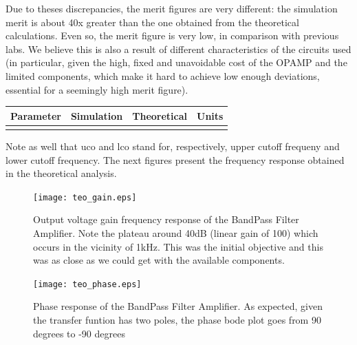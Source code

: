 Due to theses discrepancies, the merit figures are very different: the simulation merit is about 40x greater than the one obtained from the theoretical calculations. Even so, the merit figure is very low, in comparison with previous labs. We believe this is also a result of different characteristics of the circuits used (in particular, given the high, fixed and unavoidable cost of the OPAMP and the limited components, which make it hard to achieve low enough deviations, essential for a seemingly high merit figure).\par

\hfill
 \parbox{1\linewidth}{
  \centering
  \begin{tabular}{|l|l|l|r|}
    \hline    
    {\bf Parameter} & {\bf Simulation} & {\bf Theoretical } & {\bf Units }\\ \hline
    
  \label{tab:results}
  \end{tabular}
  }
  
  Note as well that uco and lco stand for, respectively, upper cutoff frequeny and lower cutoff frequency.
  The next figures present the frequency response obtained in the theoretical analysis.


\begin{figure}[H] \centering
\texttt{[image: teo\_gain.eps]}
\caption{Output voltage gain frequency response of the BandPass Filter Amplifier. Note the plateau around 40dB (linear gain of 100) which occurs in the vicinity of 1kHz. This was the initial objective and this was as close as we could get with the available components.}
\label{fig:gain_octa}
\end{figure}

\begin{figure}[H] \centering
\texttt{[image: teo\_phase.eps]}
\caption{Phase response of the BandPass Filter Amplifier. As expected, given the transfer funtion has two poles, the phase bode plot goes from 90 degrees to -90 degrees}
\label{fig:phase_octa}
\end{figure}



\pagebreak


